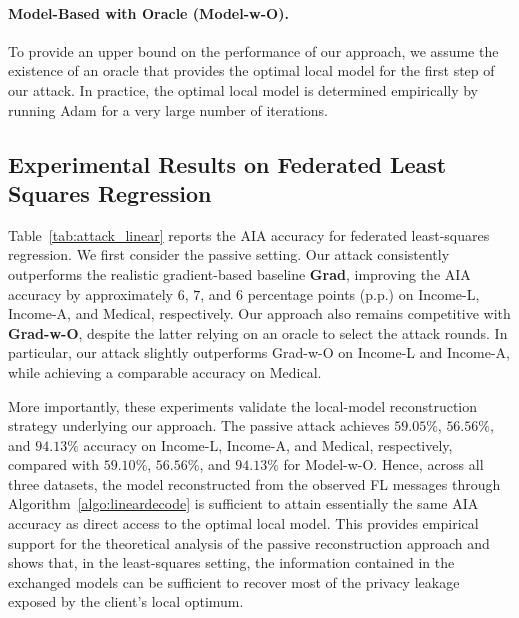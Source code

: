 \paragraph{Model-Based with Oracle (Model-w-O).} 
To provide an upper bound on the performance of our approach, we assume the existence of an oracle that provides the optimal local model for the first step of our attack. In practice, the optimal local model is determined empirically by running Adam for a very large number of iterations.

\subsection{Experimental Results on Federated Least Squares Regression}


Table~\ref{tab:attack_linear} reports the AIA accuracy for federated least-squares regression. We first consider the passive setting. Our attack consistently outperforms the realistic gradient-based baseline \textbf{Grad}, improving the AIA accuracy by approximately $6$, $7$, and $6$ percentage points (p.p.) on Income-L, Income-A, and Medical, respectively. Our approach also remains competitive with \textbf{Grad-w-O}, despite the latter relying on an oracle to select the attack rounds. In particular, our attack slightly outperforms Grad-w-O on Income-L and Income-A, while achieving a comparable accuracy on Medical.

More importantly, these experiments validate the local-model reconstruction strategy underlying our approach. The passive attack achieves $59.05\%$, $56.56\%$, and $94.13\%$ accuracy on Income-L, Income-A, and Medical, respectively, compared with $59.10\%$, $56.56\%$, and $94.13\%$ for Model-w-O. Hence, across all three datasets, the model reconstructed from the observed FL messages through Algorithm~\ref{algo:lineardecode} is sufficient to attain essentially the same AIA accuracy as direct access to the optimal local model. This provides empirical support for the theoretical analysis of the passive reconstruction approach and shows that, in the least-squares setting, the information contained in the exchanged models can be sufficient to recover most of the privacy leakage exposed by the client's local optimum.

